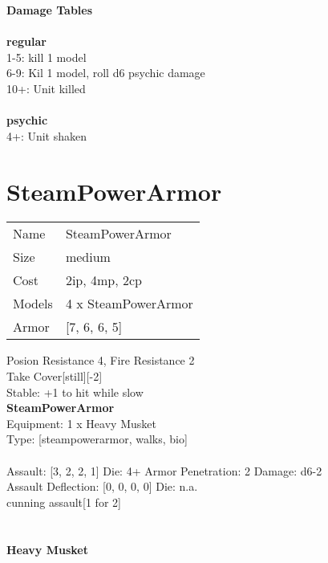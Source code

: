 {\bf Damage Tables} \\
\ \\ {\bf regular } \\
1-5: kill 1 model \\
6-9: Kil 1 model, roll d6 psychic damage \\
10+: Unit killed \\
\ \\ {\bf psychic } \\
4+: Unit shaken \\










\pagebreak\pagebreak

\section{ SteamPowerArmor }

\begin{tabular}{ll}
  Name & SteamPowerArmor \\
  Size & medium\\
  Cost & 2ip, 4mp, 2cp\\
  Models & 4 x SteamPowerArmor\\
  Armor & [7, 6, 6, 5]\\
\end{tabular}

\noindent Posion Resistance 4, Fire Resistance 2\\ 
Take Cover[still][-2]\\ 
Stable: +1 to hit while slow\\ 


{\bf SteamPowerArmor } \\
Equipment: 1 x Heavy Musket \\
Type: [steampowerarmor, walks, bio] \\
\ \\
Assault: [3, 2, 2, 1] Die: 4+ Armor Penetration: 2 Damage: d6-2 \\
Assault Deflection: [0, 0, 0, 0] Die: n.a.\\
\indent cunning assault[1 for 2]\\ 
 
\ \\

\ \\
{\bf Heavy Musket } \\



